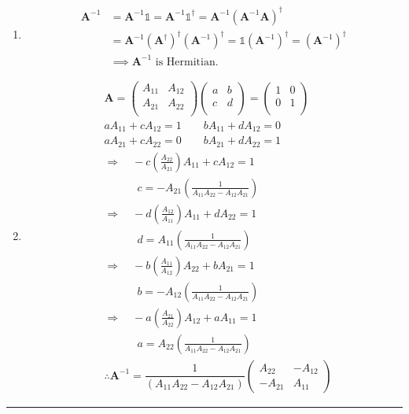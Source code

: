 \documentclass[12pt]{article}
\begin{document}
\begin{enumerate}
\item[e.]
    \[
    \begin{split}
        \mathbf{A}^{-1} & = \mathbf{A}^{-1} \mathds{1} = \mathbf{A}^{-1} \mathds{1}^{\dagger} = \mathbf{A}^{-1} (\mathbf{A}^{-1} \mathbf{A})^\dagger\\[1em]  & = \mathbf{A}^{-1} (\mathbf{A}^\dagger)^\dagger (\mathbf{A}^{-1})^\dagger = \mathds{1} (\mathbf{A}^{-1})^\dagger = (\mathbf{A}^{-1})^\dagger \\[1em]
        &\implies \mathbf{A}^{-1} \text{ is Hermitian. }
    \end{split}
    \]

\item[f.]
    \[
    \begin{split}
    & \mathbf{A} = \begin{pmatrix}
    A_{11} & A_{12} \\
    A_{21} & A_{22} \\
    \end{pmatrix}  \begin{pmatrix}
    a & b \\
    c & d \\
    \end{pmatrix} = \begin{pmatrix}
    1 & 0 \\
    0 & 1 \\
    \end{pmatrix} \\[1em]
    & aA_{11} + cA_{12} =1 \qquad bA_{11} + dA_{12} =0 \\[1em]
    & aA_{21} + cA_{22} =0 \qquad bA_{21} + dA_{22} =1 \\[1em]
    & \Rightarrow \quad-c \left(\frac{A_{22}}{A_{21}} \right)A_{11} + c A_{12} = 1 \\[1em]
     & \qquad \quad c = -A_{21} \left(\frac{1}{A_{11}A_{22}-A_{12}A_{21}}\right)\\[1em]
    & \Rightarrow \quad-d \left(\frac{A_{12}}{A_{11}} \right)A_{11} + d A_{22} = 1 \\[1em]
     & \qquad \quad d = A_{11} \left(\frac{1}{A_{11}A_{22}-A_{12}A_{21}}\right)\\[1em]
     & \Rightarrow \quad-b \left(\frac{A_{11}}{A_{12}} \right)A_{22} + b A_{21} = 1 \\[1em]
     & \qquad \quad b = -A_{12} \left(\frac{1}{A_{11}A_{22}-A_{12}A_{21}}\right)\\[1em]
     & \Rightarrow \quad-a \left(\frac{A_{21}}{A_{22}} \right)A_{12} + a A_{11} = 1 \\[1em]
     & \qquad \quad a = A_{22} \left(\frac{1}{A_{11}A_{22}-A_{12}A_{21}}\right)\\[2em]
     & \therefore \mathbf{A}^{-1} = \dfrac{1}{(A_{11}A_{22} - A_{12}A_{21})} \begin{pmatrix} A_{22} & -A_{12} \\ -A_{21} & A_{11} \end{pmatrix}
    \end{split}
    \]

\end{enumerate}
\vspace{10pt}
\hrule
\vspace{10pt}
\end{document}
